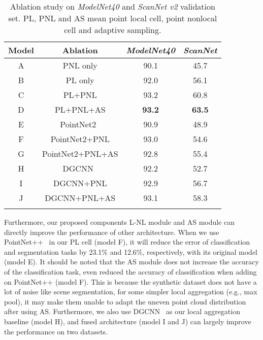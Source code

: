 \documentclass[10pt,twocolumn,letterpaper]{article}
\begin{document}
	\begin{table}
		\small
		\renewcommand\tabcolsep{3.5pt} 
		\caption{Ablation study on \textit {ModelNet40} and \textit{ScanNet v2} validation set. PL, PNL and AS mean point local cell, point nonlocal cell and adaptive sampling.}
		\begin{center}
			\begin{tabular}{cc|cc}
				
				Model& Ablation  & \textit {ModelNet40}& \textit{ScanNet} \\
				\hline
				\hline 
				A& PNL only & {90.1}& {45.7} \\	
				B& PL only  & {92.0}& {56.1} \\
				
				C& PL+PNL & {93.2}& {60.8} \\	
				D&PL+PNL+AS & {\bf{93.2}}& {\bf{63.5}} \\	
				\hline
				E& PointNet2~\cite{pointnet} & {90.9}& {48.9} \\			
				F& PointNet2+PNL & {93.0}& {54.6} \\			
				G& PointNet2+PNL+AS & {92.8}& {55.4} \\\hline
				
				H&DGCNN~\cite{DGCNN}& {92.2}& {52.7} \\
				I&DGCNN+PNL& {92.9}& {56.7} \\
				J&DGCNN+PNL+AS & {93.1}& {58.3} \\
				
				\multicolumn{3}{c}{ }\\
				
			\end{tabular}
			\label{tab:tab3}
		\end{center}
		\vspace{-1cm}
	\end{table}
	Furthermore, our proposed components L-NL module and AS module can directly improve the performance of other architecture. When we use PointNet++~\cite{pointnet2} in our PL cell (model F), it will reduce the error of classification and segmentation tasks by 23.1\% and 12.6\%, respectively, with its original model (model E). It should be noted that the AS module does not increase the accuracy of the classification task, even reduced the accuracy of classification when adding on PointNet++ (model F). This is because the synthetic dataset does not have a lot of noise like scene segmentation, for some simpler local aggregation (e.g., max pool), it may make them unable to adapt the uneven point cloud distribution after using AS.  Furthermore, we also use DGCNN~\cite{DGCNN} as our local aggregation baseline (model H), and fused architecture (model I and J) can largely improve the performance on two datasets. 
	
\end{document}
